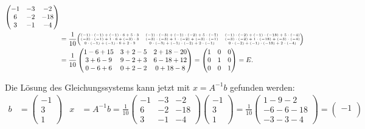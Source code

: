 \begin{loesung}
\begin{teilaufgaben}
\begin{align*}
\begin{pmatrix}
-1&-3& -2\\
 6&-2&-18\\
 3&-1& -4
\end{pmatrix}
\\
&=
\frac1{10}
{
\tiny
\begin{pmatrix}
(-1)\cdot(-1) + (-1)\cdot6 + 5\cdot3
	&(-1)\cdot(-3) + (-1)\cdot(-2) + 5\cdot(-1)
		&(-1)\cdot(-2) + (-1)\cdot(-18) + 5\cdot(-4)\\
(-3)\cdot(-1) + 1\cdot6 + (-3)\cdot3
	&(-3)\cdot(-3) + 1\cdot(-2) + (-3)\cdot(-1)
		&(-3)\cdot(-2) + 1\cdot(-18) + (-3)\cdot(-4)\\
0\cdot(-1) + (-1)\cdot6 + 2\cdot3
	&0\cdot(-3) + (-1)\cdot(-2) + 2\cdot(-1)
		&0\cdot(-2) + (-1)\cdot(-18) + 2\cdot(-4)
\end{pmatrix}
}
\\
&=
\frac1{10}
\begin{pmatrix}
1-6+15 & 3+2-5 & 2 +18 - 20\\
3+6-9  & 9 -2+3& 6-18+12\\
0-6+6  & 0+2-2&0+18-8
\end{pmatrix}
=\begin{pmatrix}
1&0&0\\
0&1&0\\
0&0&1
\end{pmatrix}=E.
\end{align*}
\item Die Lösung des Gleichungssystems kann jetzt mit $x=A^{-1}b$ gefunden
werden:
\begin{align*}
b&=
\begin{pmatrix}-1\\3\\1\end{pmatrix}
&
x&=A^{-1}b=
\frac1{10}
\begin{pmatrix}
-1&-3& -2\\
 6&-2&-18\\
 3&-1& -4
\end{pmatrix}
\begin{pmatrix}-1\\ 3\\ 1\end{pmatrix}
=
\frac1{10}
\begin{pmatrix}
 1-9-2\\
-6-6-18\\
-3-3-4
\end{pmatrix}
=
\begin{pmatrix}
-1\\

\end{pmatrix}
\end{align*}
\end{teilaufgaben}
\end{loesung}
